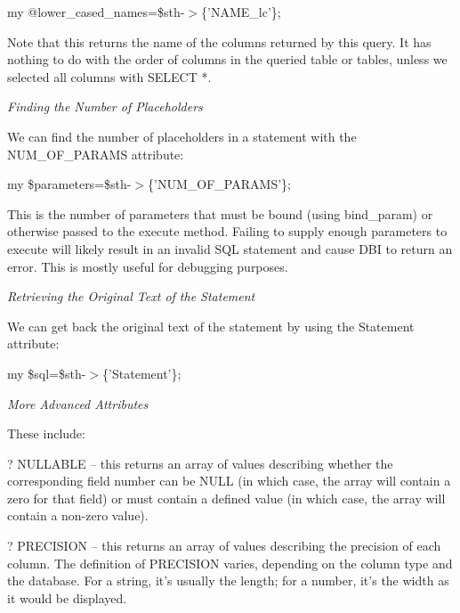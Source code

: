 \documentclass[a4paper,11pt]{book}
\begin{document}
\noindent my @lower\_cased\_names=\$sth-$>$\{'NAME\_lc'\};

\noindent 

\noindent Note that this returns the name of the columns returned by this query. It has nothing to do with the order of columns in the queried table or tables, unless we selected all columns with SELECT *.

\noindent 

\noindent \textit{Finding the Number of Placeholders}

\noindent We can find the number of placeholders in a statement with the NUM\_OF\_PARAMS attribute:

\noindent 

\noindent my \$parameters=\$sth-$>$\{'NUM\_OF\_PARAMS'\};

\noindent 

\noindent This is the number of parameters that must be bound (using bind\_param) or otherwise passed to the execute method. Failing to supply enough parameters to execute will likely result in an invalid SQL statement and cause DBI to return an error. This is mostly useful for debugging purposes.

\noindent 

\noindent \textit{Retrieving the Original Text of the Statement}

\noindent We can get back the original text of the statement by using the Statement attribute:

\noindent 

\noindent my \$sql=\$sth-$>$\{'Statement'\};

\noindent 

\noindent \textit{More Advanced Attributes}

\noindent These include:

\noindent 

\noindent ? NULLABLE -- this returns an array of values describing whether the corresponding field number can be NULL (in which case, the array will contain a zero for that field) or must contain a defined value (in which case, the array will contain a non-zero value).

\noindent 

\noindent ? PRECISION -- this returns an array of values describing the precision of each column. The definition of PRECISION varies, depending on the column type and the database. For a string, it's usually the length; for a number, it's the width as it would be displayed.

\noindent 
\end{document}
